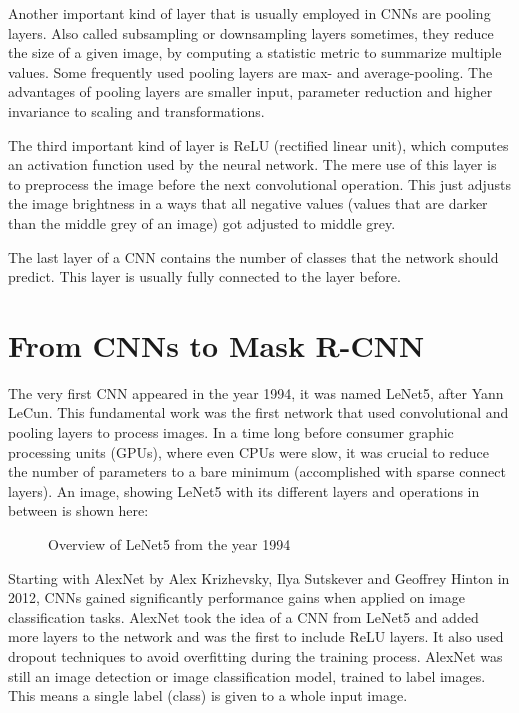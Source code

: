 Another important kind of layer that is usually employed in CNNs are pooling layers. Also called subsampling or downsampling layers sometimes, they reduce the size of a given image, by computing a statistic metric to summarize multiple values. Some frequently used pooling layers are max- and average-pooling. The advantages of pooling layers are smaller input, parameter reduction and higher invariance to scaling and transformations.

The third important kind of layer is ReLU (rectified linear unit), which computes an activation function used by the neural network. The mere use of this layer is to preprocess the image before the next convolutional operation. This just adjusts the image brightness in a ways that all negative values (values that are darker than the middle grey of an image) got adjusted to middle grey.

The last layer of a CNN contains the number of classes that the network should predict. This layer is usually fully connected to the layer before.

\section{From CNNs to Mask R-CNN}

The very first CNN appeared in the year 1994, it was named LeNet5, after Yann LeCun. This fundamental work was the first network that used convolutional and pooling layers to process images. In a time long before consumer graphic processing units (GPUs), where even CPUs were slow, it was crucial to reduce the number of parameters to a bare minimum (accomplished with sparse connect layers). An image, showing LeNet5 with its different layers and operations in between is shown here:

\begin{figure}[H]
	\caption{\label{fig:lenet5} Overview of LeNet5 from the year 1994}
\end{figure}

Starting with AlexNet by Alex Krizhevsky, Ilya Sutskever and Geoffrey Hinton in 2012, CNNs gained significantly performance gains when applied on image classification tasks. AlexNet took the idea of a CNN from LeNet5 and added more layers to the network and was the first to include ReLU layers. It also used dropout techniques to avoid overfitting during the training process. AlexNet was still an image detection or image classification model, trained to label images. This means a single label (class) is given to a whole input image.

